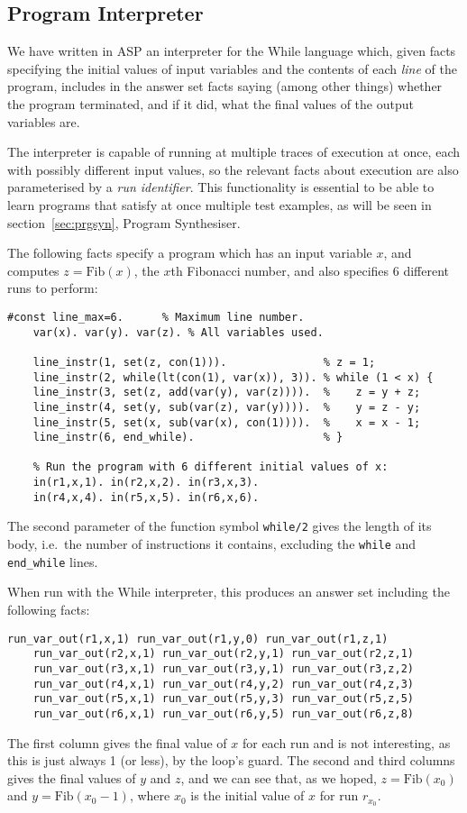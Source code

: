 \documentclass[a4paper,twoside,notitlepage]{article}
\newcommand{\ttt}{\texttt}
\begin{document}
\subsection{Program Interpreter}

We have written in ASP an interpreter for the While language which, given 
facts specifying the initial values of input variables and the contents of 
each \emph{line} of the program, includes in the answer set facts saying 
(among other things) whether the program terminated, and if it did, what the 
final values of the output variables are.

The interpreter is capable of running at multiple traces of execution at once, 
each with possibly different input values, so the relevant facts about 
execution are also parameterised by a \emph{run identifier}. This 
functionality is essential to be able to learn programs that satisfy at once 
multiple test examples, as will be seen in section~\ref{sec:prgsyn}, Program 
Synthesiser.

The following facts specify a program which has an input variable $x$, and 
computes $z = \textrm{Fib}(x)$, the $x$th Fibonacci number, and also specifies 
6 different runs to perform:
\begin{Verbatim}[samepage=true]
    #const line_max=6.      % Maximum line number.
    var(x). var(y). var(z). % All variables used.
    
    line_instr(1, set(z, con(1))).               % z = 1;
    line_instr(2, while(lt(con(1), var(x)), 3)). % while (1 < x) {
    line_instr(3, set(z, add(var(y), var(z)))).  %    z = y + z;
    line_instr(4, set(y, sub(var(z), var(y)))).  %    y = z - y;
    line_instr(5, set(x, sub(var(x), con(1)))).  %    x = x - 1;
    line_instr(6, end_while).                    % }
    
    % Run the program with 6 different initial values of x:
    in(r1,x,1). in(r2,x,2). in(r3,x,3).
    in(r4,x,4). in(r5,x,5). in(r6,x,6).
\end{Verbatim}
The second parameter of the function symbol \texttt{while/2} gives the 
length of its body, i.e.\ the number of instructions it contains, 
excluding the \ttt{while} and \ttt{end\_while} lines.

When run with the While interpreter, this produces an answer set including the 
following facts:
\begin{Verbatim}[samepage=true]
    run_var_out(r1,x,1) run_var_out(r1,y,0) run_var_out(r1,z,1) 
    run_var_out(r2,x,1) run_var_out(r2,y,1) run_var_out(r2,z,1) 
    run_var_out(r3,x,1) run_var_out(r3,y,1) run_var_out(r3,z,2) 
    run_var_out(r4,x,1) run_var_out(r4,y,2) run_var_out(r4,z,3)
    run_var_out(r5,x,1) run_var_out(r5,y,3) run_var_out(r5,z,5)
    run_var_out(r6,x,1) run_var_out(r6,y,5) run_var_out(r6,z,8) 
\end{Verbatim}
The first column gives the final value of $x$ for each run and is not 
interesting, as this is just always 1 (or less), by the loop's guard. The 
second and third columns gives the final values of $y$ and $z$, and we can see 
that, as we hoped, $z=\textrm{Fib}(x_0)$ and $y=\textrm{Fib}(x_0-1)$, where 
$x_0$ is the initial value of $x$ for run $r_{x_0}$.
\end{document}
